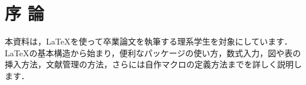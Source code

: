 \chapter{序 論}
本資料は，\LaTeX を使って卒業論文を執筆する理系学生を対象にしています．\LaTeX の基本構造から始まり，便利なパッケージの使い方，数式入力，図や表の挿入方法，文献管理の方法，さらには自作マクロの定義方法までを詳しく説明します．

